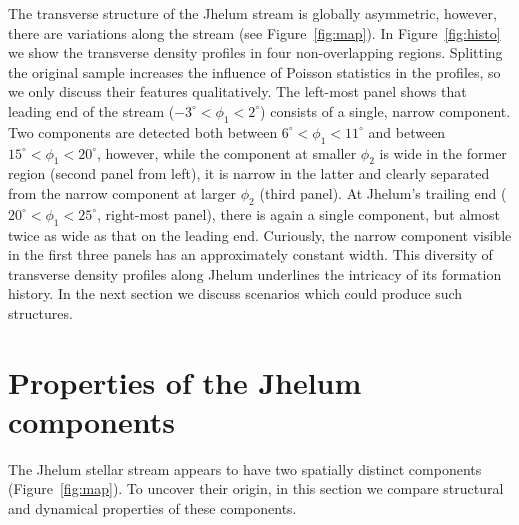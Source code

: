 \documentclass[twocolumn]{aastex62}
\begin{document}
The transverse structure of the Jhelum stream is globally asymmetric, however, there are variations along the stream (see Figure~\ref{fig:map}).
In Figure~\ref{fig:histo} we show the transverse density profiles in four non-overlapping regions.
Splitting the original sample increases the influence of Poisson statistics in the profiles, so we only discuss their features qualitatively.
The left-most panel shows that leading end of the stream ($-3^\circ<\phi_1<2^\circ$) consists of a single, narrow component.
Two components are detected both between $6^\circ<\phi_1<11^\circ$ and between $15^\circ<\phi_1<20^\circ$, however, while the component at smaller $\phi_2$ is wide in the former region (second panel from left), it is narrow in the latter and clearly separated from the narrow component at larger $\phi_2$ (third panel).
At Jhelum's trailing end ($20^\circ<\phi_1<25^\circ$, right-most panel), there is again a single component, but almost twice as wide as that on the leading end.
Curiously, the narrow component visible in the first three panels has an approximately constant width.
This diversity of transverse density profiles along Jhelum underlines the intricacy of its formation history.
In the next section we discuss scenarios which could produce such structures.

\section{Properties of the Jhelum components}
\label{sec:origin}
The Jhelum stellar stream appears to have two spatially distinct components (Figure~\ref{fig:map}).
To uncover their origin, in this section we compare structural and dynamical properties of these components.

\end{document}
